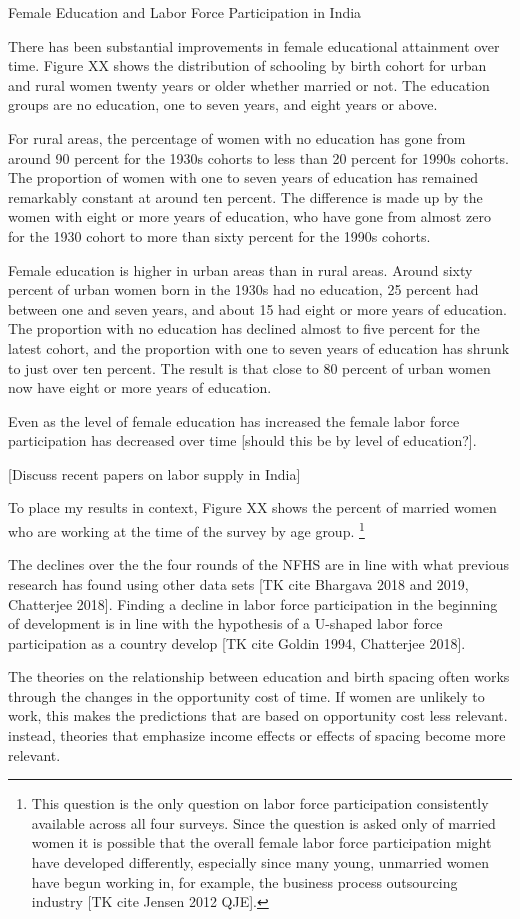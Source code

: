 Female Education and Labor Force Participation in India

There has been substantial improvements in female educational attainment over time.
Figure XX shows the distribution of schooling by birth cohort for urban and rural women 
twenty years or older whether married or not.
The education groups are no education, one to seven years, and eight years or
above.

For rural areas, the percentage of women with no education has gone from around 90 percent
for the 1930s cohorts to less than 20 percent for 1990s cohorts. 
The proportion of women with one to seven years of education has remained remarkably
constant at around ten percent.
The difference is made up by the women with eight or more years of education, who have
gone from almost zero for the 1930 cohort to more than sixty percent for the 1990s cohorts.

Female education is higher in urban areas than in rural areas.
Around sixty percent of urban women born in the 1930s had no education, 25 percent had
between one and seven years, and about 15 had eight or more years of education.
The proportion with no education has declined almost to five percent for the latest
cohort, and the proportion with one to seven years of education has shrunk to just over
ten percent.
The result is that close to 80 percent of urban women now have eight or more years of
education.

Even as the level of female education has increased the female labor force participation 
has decreased over time [should this be by level of education?].

[Discuss recent papers on labor supply in India]


To place my results in context, Figure XX shows the percent of married women who are 
working at the time of the survey by age group.%
\footnote{
This question is the only question on labor force participation consistently available 
across all four surveys.
Since the question is asked only of married women it is possible that the overall
female labor force participation might have developed differently, especially since
many young, unmarried women have begun working in, for example, the business process 
outsourcing industry [TK cite Jensen 2012 QJE].
}


The declines over the the four rounds of the NFHS are in line with what previous
research has found using other data sets [TK cite Bhargava 2018 and 2019, Chatterjee 2018].
Finding a decline in labor force participation in the beginning of development is
in line with the hypothesis of a U-shaped labor force participation as a country
develop [TK cite Goldin 1994, Chatterjee 2018].



The theories on the relationship between education and birth spacing often works 
through the changes in the opportunity cost of time. 
If women are unlikely to work, this makes the predictions that are based on
opportunity cost less relevant. 
instead, theories that emphasize income effects or effects of spacing become
more relevant. 


